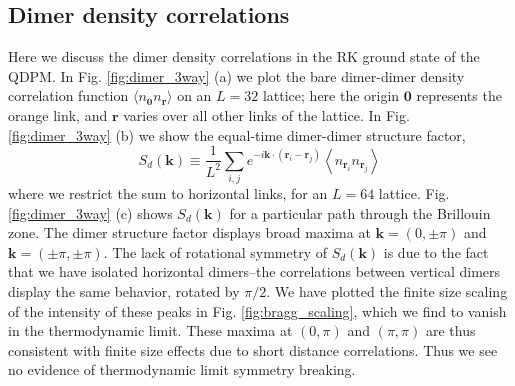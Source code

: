 \documentclass[twocolumn,prb,aps,floatfix,superscriptaddress]{revtex4-1}
\newcommand{\figref}[1]{Fig. \ref{#1}}
\begin{document}
\subsection{Dimer density correlations}

Here we discuss the dimer density correlations in the RK ground state of the QDPM. In \figref{fig:dimer_3way} (a) we plot the bare dimer-dimer density correlation function $\langle n_{\bm{0}} n_{\bm{r}}\rangle$ on an $L=32$ lattice; here the origin $\bm{0}$ represents the orange link, and $\bm{r}$ varies over all other links of the lattice. In \figref{fig:dimer_3way} (b) we show the equal-time dimer-dimer structure factor, 
\begin{equation}
S_d\left( \bm{k} \right) \equiv \frac{1}{ L^2} \sum_{i,j} e^{-i \bm{k} \cdot \left(\bm{r}_i - \bm{r}_j\right)} \left \langle n_{\bm{r}_i} n_{\bm{r}_j} \right \rangle
\end{equation}
where we restrict the sum to horizontal links, for an $L=64$ lattice. 
\figref{fig:dimer_3way} (c) shows $S_d(\bm{k})$ for a particular path through the Brillouin zone. The dimer structure factor displays broad maxima at $\bm{k} = (0, \pm \pi)$ and $\bm{k} = (\pm \pi, \pm \pi)$. The lack of rotational symmetry of $S_d(\bm{k})$ is due to the fact that we have isolated horizontal dimers--the correlations between vertical dimers display the same behavior, rotated by $\pi/2$.
We have plotted the finite size scaling of the intensity of these peaks in  \figref{fig:bragg_scaling}, which we find to vanish in the thermodynamic limit. These maxima at $(0,\pi)$ and $(\pi,\pi)$ are thus consistent with finite size effects due to short distance correlations. Thus we see no evidence of thermodynamic limit symmetry breaking.
\end{document}
